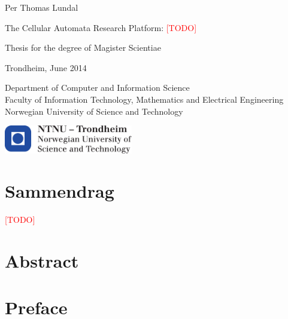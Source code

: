 \documentclass[a4paper,twoside,12pt]{book}
\newcommand\TODO{\textcolor{red}{[TODO]}}
\begin{document}
\begin{titlepage}
\large
Per Thomas Lundal

\vspace{2cm}

\huge
The Cellular Automata Research Platform:
\TODO

\vspace{2cm}

\normalsize
Thesis for the degree of Magister Scientiae

\vspace{1cm}

Trondheim, June 2014

\vspace{1cm}

Department of Computer and Information Science \\
Faculty of Information Technology, Mathematics and Electrical Engineering \\
Norwegian University of Science and Technology \\

\vfill

\center
\includegraphics[width=0.42\textwidth]{ntnu}

\end{titlepage}

\clearpage
\null
{}
\newpage


\cleardoublepage
{}
{}
\chapter*{Sammendrag}
    \TODO

\cleardoublepage
{}
{}
\chapter*{Abstract}
    

\cleardoublepage
{}
{}
\chapter*{Preface}
    
\end{document}

